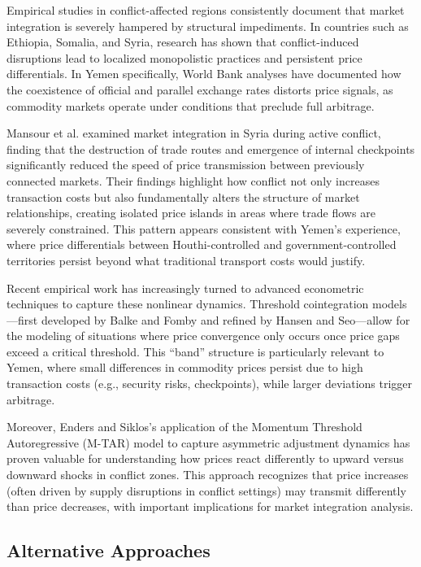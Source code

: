 Empirical studies in conflict-affected regions consistently document that market integration is severely hampered by structural impediments. In countries such as Ethiopia, Somalia, and Syria, research has shown that conflict-induced disruptions lead to localized monopolistic practices and persistent price differentials.\autocite{dercon1995, little2007, worldbank2020} In Yemen specifically, World Bank analyses have documented how the coexistence of official and parallel exchange rates distorts price signals, as commodity markets operate under conditions that preclude full arbitrage.\autocite{worldbank2022}

Mansour et al. examined market integration in Syria during active conflict, finding that the destruction of trade routes and emergence of internal checkpoints significantly reduced the speed of price transmission between previously connected markets.\autocite{mansour2021} Their findings highlight how conflict not only increases transaction costs but also fundamentally alters the structure of market relationships, creating isolated price islands in areas where trade flows are severely constrained. This pattern appears consistent with Yemen's experience, where price differentials between Houthi-controlled and government-controlled territories persist beyond what traditional transport costs would justify.

Recent empirical work has increasingly turned to advanced econometric techniques to capture these nonlinear dynamics. Threshold cointegration models—first developed by Balke and Fomby and refined by Hansen and Seo—allow for the modeling of situations where price convergence only occurs once price gaps exceed a critical threshold.\autocite{balke1997, hansen2002} This ``band'' structure is particularly relevant to Yemen, where small differences in commodity prices persist due to high transaction costs (e.g., security risks, checkpoints), while larger deviations trigger arbitrage.

Moreover, Enders and Siklos's application of the Momentum Threshold Autoregressive (M-TAR) model to capture asymmetric adjustment dynamics has proven valuable for understanding how prices react differently to upward versus downward shocks in conflict zones.\autocite{enders2001} This approach recognizes that price increases (often driven by supply disruptions in conflict settings) may transmit differently than price decreases, with important implications for market integration analysis.

\subsection{Alternative Approaches}

